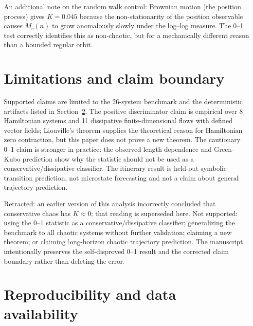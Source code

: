 \documentclass[aip,cha,preprint,amsmath,amssymb,floatfix]{revtex4-2}
\begin{document}
An additional note on the random walk control: Brownian motion (the position
process) gives $K=0.045$ because the non-stationarity of the position observable
causes $M_c(n)$ to grow anomalously slowly under the log--log measure. The 0--1
test correctly identifies this as non-chaotic, but for a mechanically different
reason than a bounded regular orbit.

\section{Limitations and claim boundary}

Supported claims are limited to the 26-system benchmark and the deterministic
artifacts listed in Section~\ref{sec:repro}. The positive discriminator claim is empirical over 8
Hamiltonian systems and 11 dissipative finite-dimensional flows with defined vector
fields; Liouville's theorem supplies the theoretical reason for Hamiltonian zero
contraction, but this paper does not prove a new theorem. The cautionary 0--1 claim
is stronger in practice: the observed length dependence and Green--Kubo prediction
show why the statistic should not be used as a conservative/dissipative classifier.
The itinerary result is held-out symbolic transition prediction, not microstate
forecasting and not a claim about general trajectory prediction.

Retracted: an earlier version of this analysis incorrectly concluded that
conservative chaos has $K\approx0$; that reading is superseded here.
Not supported: using the 0--1 statistic as a conservative/dissipative classifier;
generalizing the benchmark to all chaotic systems without further validation;
claiming a new theorem; or claiming long-horizon chaotic trajectory prediction.
The manuscript intentionally preserves the self-disproved 0--1 result and the
corrected claim boundary rather than deleting the error.

\section{Reproducibility and data availability}
\label{sec:repro}
\end{document}
